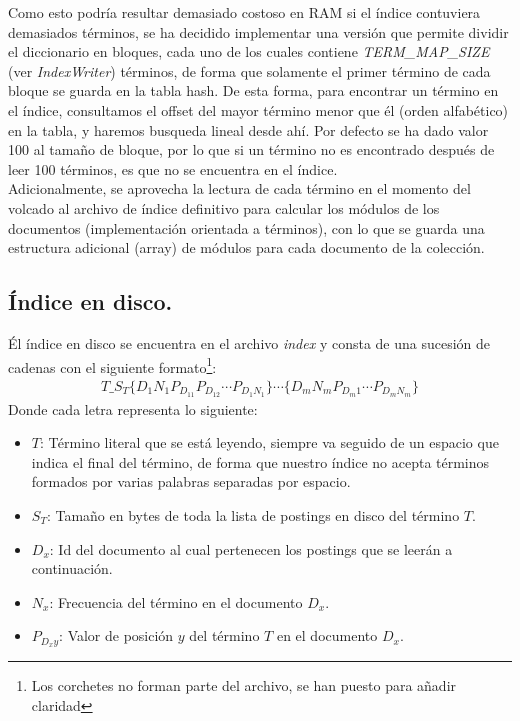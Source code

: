 \documentclass[spanish]{assignment}
\begin{document}
	Como esto podría resultar demasiado costoso en RAM si el índice contuviera demasiados términos, se ha decidido implementar una versión que permite dividir el diccionario en bloques, cada uno de los cuales contiene \textit{TERM\_MAP\_SIZE} (ver \textit{IndexWriter}) términos, de forma que solamente el primer término de cada bloque se guarda en la tabla hash. De esta forma, para encontrar un término en el índice, consultamos el offset del mayor término menor que él (orden alfabético) en la tabla, y haremos busqueda lineal desde ahí. Por defecto se ha dado valor 100 al tamaño de bloque, por lo que si un término no es encontrado después de leer 100 términos, es que no se encuentra en el índice.\\
	
	Adicionalmente, se aprovecha la lectura de cada término en el momento del volcado al archivo de índice definitivo para calcular los módulos de los documentos (implementación orientada a términos), con lo que se guarda una estructura adicional (array) de módulos para cada documento de la colección.
	
	\subsection{Índice en disco.}
	Él índice en disco se encuentra en el archivo \textit{index} y consta de una sucesión de cadenas con el siguiente formato\footnote{Los corchetes no forman parte del archivo, se han puesto para añadir claridad}:
	\begin{align*}
	T\_S_T\{D_1N_1P_{D_11}P_{D_12}\cdots P_{D_1N_1}\}\cdots \{D_mN_mP_{D_m1}\cdots P_{D_mN_m}\}
	\end{align*}
	Donde cada letra representa lo siguiente:
	\begin{itemize}
		\item$T$: Término literal que se está leyendo, siempre va seguido de un espacio que indica el final del término, de forma que nuestro índice no acepta términos formados por varias palabras separadas por espacio.
		\item$S_T$: Tamaño en bytes de toda la lista de postings en disco del término $T$.
		\item$D_x$: Id del documento al cual pertenecen los postings que se leerán a continuación.
		\item$N_x$: Frecuencia del término en el documento $D_x$.
		\item$P_{D_xy}$: Valor de posición $y$ del término $T$ en el documento $D_x$.
	\end{itemize}
	
\end{document}
